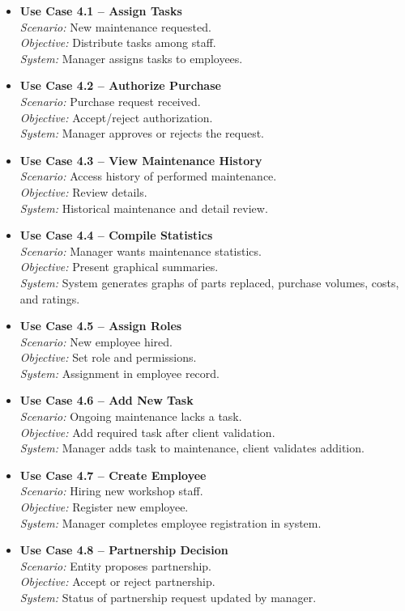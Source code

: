 \begin{itemize}
    \item \textbf{Use Case 4.1 – Assign Tasks}\\
    \textit{Scenario:} New maintenance requested.\\
    \textit{Objective:} Distribute tasks among staff.\\
    \textit{System:} Manager assigns tasks to employees.
    \item \textbf{Use Case 4.2 – Authorize Purchase}\\
    \textit{Scenario:} Purchase request received.\\
    \textit{Objective:} Accept/reject authorization.\\
    \textit{System:} Manager approves or rejects the request.
    \item \textbf{Use Case 4.3 – View Maintenance History}\\
    \textit{Scenario:} Access history of performed maintenance.\\
    \textit{Objective:} Review details.\\
    \textit{System:} Historical maintenance and detail review.
    \item \textbf{Use Case 4.4 – Compile Statistics}\\
    \textit{Scenario:} Manager wants maintenance statistics.\\
    \textit{Objective:} Present graphical summaries.\\
    \textit{System:} System generates graphs of parts replaced, purchase volumes, costs, and ratings.
    \item \textbf{Use Case 4.5 – Assign Roles}\\
    \textit{Scenario:} New employee hired.\\
    \textit{Objective:} Set role and permissions.\\
    \textit{System:} Assignment in employee record.
    \item \textbf{Use Case 4.6 – Add New Task}\\
    \textit{Scenario:} Ongoing maintenance lacks a task.\\
    \textit{Objective:} Add required task after client validation.\\
    \textit{System:} Manager adds task to maintenance, client validates addition.
    \item \textbf{Use Case 4.7 – Create Employee}\\
    \textit{Scenario:} Hiring new workshop staff.\\
    \textit{Objective:} Register new employee.\\
    \textit{System:} Manager completes employee registration in system.
    \item \textbf{Use Case 4.8 – Partnership Decision}\\
    \textit{Scenario:} Entity proposes partnership.\\
    \textit{Objective:} Accept or reject partnership.\\
    \textit{System:} Status of partnership request updated by manager.
\end{itemize}




